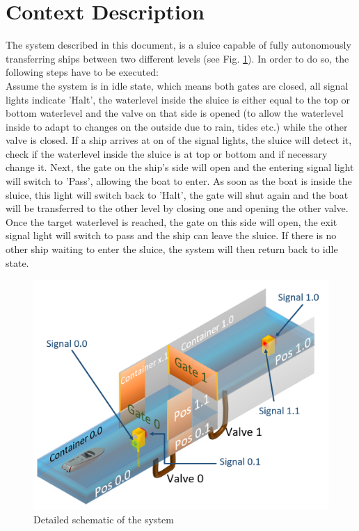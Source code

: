 \section{Context Description}
The system described in this document, is a sluice capable of fully autonomously transferring ships between two different levels (see Fig. \ref{fig:boat1}). In order to do so, the following steps have to be executed:\\
Assume the system is in idle state, which means both gates are closed, all signal lights indicate 'Halt', the waterlevel inside the sluice is either equal to the top or bottom waterlevel and the valve on that side is opened (to allow the waterlevel inside to adapt to changes on the outside due to rain, tides etc.) while the other valve is closed. If a ship arrives at on of the signal lights, the sluice will detect it, check if the waterlevel inside the sluice is at top or bottom and if necessary change it. Next, the gate on the ship's side will open and the entering signal light will switch to 'Pass', allowing the boat to enter. As soon as the boat is inside the sluice, this light will switch back to 'Halt', the gate will shut again and the boat will be transferred to the other level by closing one and opening the other valve. Once the target waterlevel is reached, the gate on this side will open, the exit signal light will switch to pass and the ship can leave the sluice. If there is no other ship waiting to enter the sluice, the system will then return back to idle state.

\begin{figure}[!h]
	\includegraphics[width=\linewidth]{PictureName10}
	\caption{Detailed schematic of the system}
	\label{fig:boat1}
\end{figure}